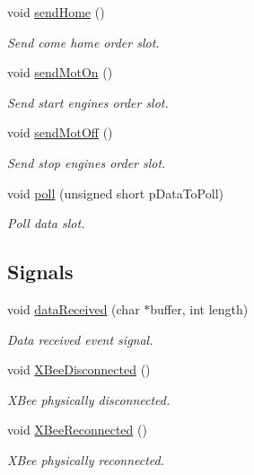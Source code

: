 \begin{DoxyCompactItemize}
void \hyperlink{class_com_thread_ac0e1ae3106b257f907045ecc0437a236}{send\-Home} ()
\begin{DoxyCompactList}\small\item\em Send come home order slot. \end{DoxyCompactList}\item 
void \hyperlink{class_com_thread_a43cbfa5b9a0a7e40c60d51c2eff20cf6}{send\-Mot\-On} ()
\begin{DoxyCompactList}\small\item\em Send start engines order slot. \end{DoxyCompactList}\item 
void \hyperlink{class_com_thread_a97dc07c272f14895ad88a366047fb945}{send\-Mot\-Off} ()
\begin{DoxyCompactList}\small\item\em Send stop engines order slot. \end{DoxyCompactList}\item 
void \hyperlink{class_com_thread_af86a575e117f152922f1fcb6f11c654c}{poll} (unsigned short p\-Data\-To\-Poll)
\begin{DoxyCompactList}\small\item\em Poll data slot. \end{DoxyCompactList}\end{DoxyCompactItemize}
\subsection*{Signals}
\begin{DoxyCompactItemize}
\item 
void \hyperlink{class_com_thread_ac19d5b77bcf03b75691351f7f101fcd9}{data\-Received} (char $\ast$buffer, int length)
\begin{DoxyCompactList}\small\item\em Data received event signal. \end{DoxyCompactList}\item 
void \hyperlink{class_com_thread_aae9d4c55c9d0bee44356ce8a56faa8da}{X\-Bee\-Disconnected} ()
\begin{DoxyCompactList}\small\item\em X\-Bee physically disconnected. \end{DoxyCompactList}\item 
void \hyperlink{class_com_thread_a01fda5f9535c7472c77d9a98bfbe38f8}{X\-Bee\-Reconnected} ()
\begin{DoxyCompactList}\small\item\em X\-Bee physically reconnected. \end{DoxyCompactList}\end{DoxyCompactItemize}
